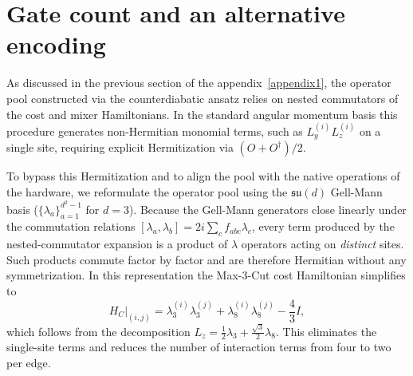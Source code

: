%
%
%
%

\section{Gate count and an alternative encoding}
\label{sec:gell_mann}

As discussed in the previous section of the appendix~\ref{appendix1}, the operator pool constructed via the counterdiabatic ansatz relies on nested commutators of the cost and mixer Hamiltonians. In the standard angular momentum basis this procedure generates non-Hermitian monomial terms, such as $L_y^{(i)} L_z^{(i)}$ on a single site, requiring explicit Hermitization via $(O + O^\dagger)/2$.

To bypass this Hermitization and to align the pool with the native operations of the hardware, we reformulate the operator pool using the $\mathfrak{su}(d)$ Gell-Mann basis ($\{\lambda_a\}_{a=1}^{d^2-1}$ for $d=3$). Because the Gell-Mann generators close linearly under the commutation relations $[\lambda_a, \lambda_b] = 2i \sum_{c} f_{abc} \lambda_c$, every term produced by the nested-commutator expansion is a product of $\lambda$ operators acting on \emph{distinct} sites. Such products commute factor by factor and are therefore Hermitian without any symmetrization. In this representation the Max-3-Cut cost Hamiltonian simplifies to
\begin{equation}
\label{eq:hc_gellmann}
H_C\big|_{(i,j)} = \lambda_3^{(i)}\lambda_3^{(j)} + \lambda_8^{(i)}\lambda_8^{(j)} - \frac{4}{3}I,
\end{equation}
which follows from the decomposition $L_z = \tfrac{1}{2}\lambda_3 + \tfrac{\sqrt{3}}{2}\lambda_8$. This eliminates the single-site terms and reduces the number of interaction terms from four to two per edge.

